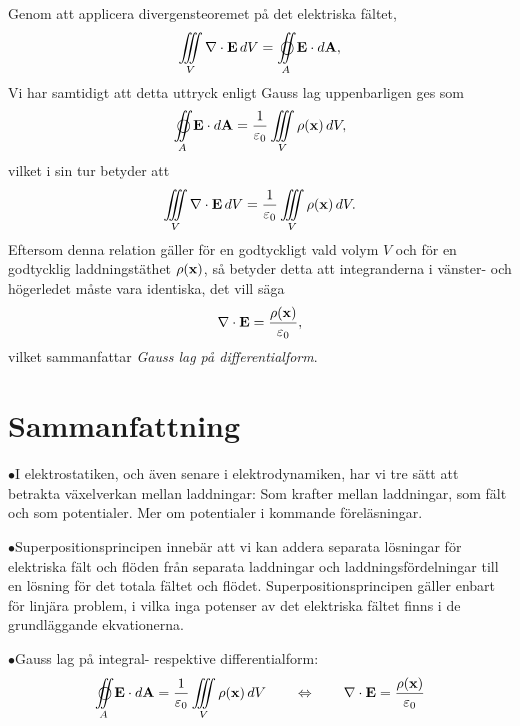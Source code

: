 Genom att applicera divergensteoremet p{\aa} det elektriska f{\"a}ltet,
$$
  \iiint_V\nabla\cdot{\bf E}\,dV=\oiint_A{\bf E}\cdot d{\bf A},
$$
Vi har samtidigt att detta uttryck enligt Gauss lag uppenbarligen ges som
$$
  \oiint_A {\bf E}\cdot d{\bf A}
     ={{1}\over{\varepsilon_0}}\iiint_V\rho({\bf x})\,dV,
$$
vilket i sin tur betyder att
$$
  \iiint_V\nabla\cdot{\bf E}\,dV
     ={{1}\over{\varepsilon_0}}\iiint_V\rho({\bf x})\,dV.
$$
Eftersom denna relation g{\"a}ller f{\"o}r en godtyckligt vald volym $V$ och f{\"o}r en godtycklig laddnings\-t{\"a}t\-het $\rho({\bf x})$, s{\aa} betyder detta att integranderna i v{\"a}nster- och h{\"o}gerledet m{\aa}ste vara identiska, det vill s{\"a}ga
$$
  \nabla\cdot{\bf E}={{\rho({\bf x})}\over{\varepsilon_0}},
$$
vilket sammanfattar {\it Gauss lag p{\aa} differentialform}.


\section{Sammanfattning}
\item{$\bullet$}{I elektrostatiken, och {\"a}ven senare i elektrodynamiken, har vi tre s{\"a}tt att betrakta v{\"a}xelverkan mellan laddningar: Som krafter mellan laddningar, som f{\"a}lt och som potentialer. Mer om potentialer i kommande f{\"o}rel{\"a}sningar.}
\item{$\bullet$}{Superpositionsprincipen inneb{\"a}r att vi kan addera separata l{\"o}sningar f{\"o}r elektriska f{\"a}lt och fl{\"o}den fr{\aa}n separata laddningar och laddningsf{\"o}rdelningar till en l{\"o}sning f{\"o}r det totala f{\"a}ltet och fl{\"o}det. Superpositionsprincipen g{\"a}ller enbart f{\"o}r linj{\"a}ra problem, i vilka inga potenser av det elektriska f{\"a}ltet finns i de grundl{\"a}ggande ekvationerna.}
\item{$\bullet$}{Gauss lag p{\aa} integral- respektive differentialform:
$$
  \oiint_A {\bf E}\cdot d{\bf A}
     ={{1}\over{\varepsilon_0}}\iiint_V\rho({\bf x})\,dV
\qquad\Leftrightarrow\qquad
\nabla\cdot{\bf E}={{\rho({\bf x})}\over{\varepsilon_0}}
$$}

\bye

